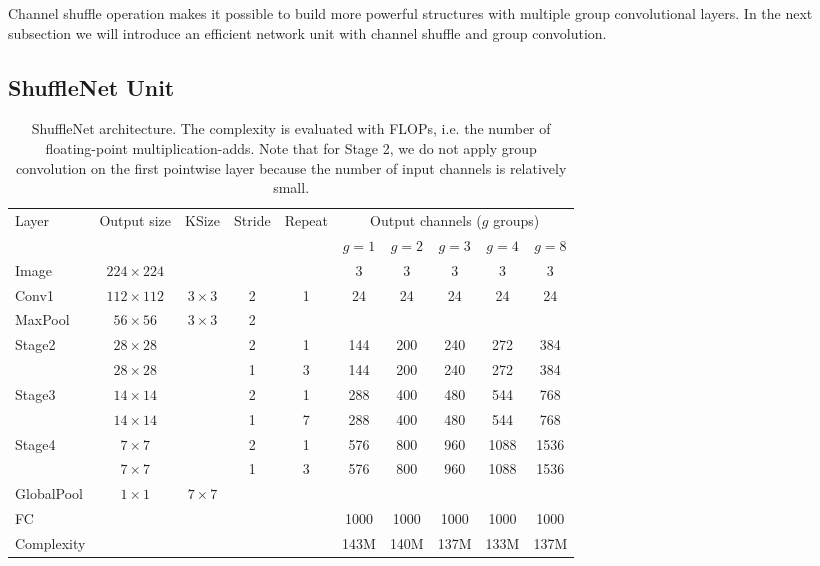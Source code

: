 \documentclass[10pt,twocolumn,letterpaper]{article}
\begin{document}
Channel shuffle operation makes it possible to build more powerful structures with multiple group convolutional layers. In the next subsection we will introduce an efficient network unit with channel shuffle and group convolution.


\subsection{ShuffleNet Unit}
\label{sec:unit}

\begin{table}[ht]
	\begin{center}
		\begin{tabular}{l|c|c|c|c|ccccc}
			\hline
			Layer & Output size & KSize & Stride & Repeat & \multicolumn{5}{c}{Output channels ($g$ groups)} \\
			& & & & & $g=1$ & $g=2$ & $g=3$ & $g=4$ & $g=8$ \\
			\hline \hline
			Image & $224\times 224$ & & & & 3 & 3 & 3 & 3 & 3 \\
			\hline
			Conv1 & $112\times 112$ & $3\times 3$ & 2 & 1 & 24 & 24 & 24 & 24 & 24 \\
			MaxPool & $56\times 56$ & $3\times 3$ & 2 &  &  &  &  &  &  \\
			\hline
			Stage2 & $28\times 28$ & & 2 & 1 & 144 & 200 & 240 & 272 & 384 \\
			& $28\times 28$ & & 1 & 3 & 144 & 200 & 240 & 272 & 384 \\
			\hline
			Stage3 & $14\times 14$ & & 2 & 1 & 288 & 400 & 480 & 544 & 768 \\
			& $14\times 14$ & & 1 & 7 & 288 & 400 & 480 & 544 & 768 \\
			\hline
			Stage4 & $7\times 7$ & & 2 & 1 & 576 & 800 & 960 & 1088 & 1536 \\
			& $7\times 7$ & & 1 & 3 & 576 & 800 & 960 & 1088 & 1536 \\
			\hline
			GlobalPool & $1\times1$ & $7\times 7$ & & & & & & & \\ 
			\hline
			FC & & & & & 1000 & 1000 & 1000 & 1000 & 1000 \\
			\hline \hline
			Complexity & & & & & 143M & 140M & 137M & 133M & 137M \\
			\hline
		\end{tabular}
	\end{center}
	\caption{ShuffleNet architecture. The complexity is evaluated with FLOPs, i.e. the number of floating-point multiplication-adds. Note that for Stage 2, we do not apply group convolution on the first pointwise layer because the number of input channels is relatively small.}
	\label{tbl:arch}
\end{table}
\end{document}
